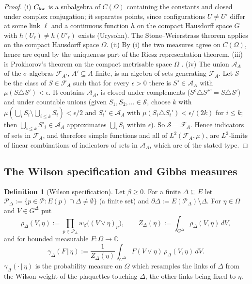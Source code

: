 \documentclass[11pt,a4paper]{article}
\theoremstyle{definition}
\newtheorem{definition}[theorem]{Definition}
\theoremstyle{remark}
\newcommand{\C}{\mathbb{C}}
\newcommand{\cA}{\mathcal{A}}
\newcommand{\cF}{\mathcal{F}}
\newcommand{\cP}{\mathcal{P}}
\begin{document}
\begin{proof}
(i) $C_{\rm loc}$ is a subalgebra of $C(\Omega)$ containing the constants and closed under complex conjugation; it
separates points, since configurations $U\neq U'$ differ at some link $\ell$ and a continuous function $h$ on the compact
Hausdorff space $G$ with $h(U_\ell)\ne h(U'_\ell)$ exists (Urysohn). The Stone--Weierstrass theorem applies on the compact
Hausdorff space $\Omega$. (ii) By (i) the two measures agree on $C(\Omega)$, hence are equal by the uniqueness part of the
Riesz representation theorem. (iii) is Prokhorov's theorem on the compact metrisable space $\Omega$ \cite[Section~5]{Bil99}.
(iv) The union $\cA_A$ of the $\sigma$-algebras $\cF_{A'}$, $A'\subseteq A$ finite, is an algebra of sets generating
$\cF_A$. Let $\mathcal S$ be the class of $S\in\cF_A$ such that for every $\epsilon>0$ there is $S'\in\cA_A$ with
$\mu(S\triangle S')<\epsilon$. It contains $\cA_A$, is closed under complements ($S^c\triangle S'^c=S\triangle S'$) and under
countable unions (given $S_1,S_2,\ldots\in\mathcal S$, choose $k$ with $\mu(\bigcup_iS_i\setminus\bigcup_{i\le k}S_i)<\epsilon/2$
and $S_i'\in\cA_A$ with $\mu(S_i\triangle S_i')<\epsilon/(2k)$ for $i\le k$; then $\bigcup_{i\le k}S'_i\in\cA_A$ approximates
$\bigcup_iS_i$ within $\epsilon$). So $\mathcal S=\cF_A$. Hence indicators of sets in $\cF_A$, and therefore simple functions
and all of $L^2(\cF_A,\mu)$, are $L^2$-limits of linear combinations of indicators of sets in $\cA_A$, which are of the
stated type.
\end{proof}

\subsection{The Wilson specification and Gibbs measures}

\begin{definition}[Wilson specification]\label{iv:def:spec}
Let $\beta\ge0$. For a finite $\Delta\subseteq E$ let $\cP_\Delta:=\{p\in\cP:E(p)\cap\Delta\neq\emptyset\}$ (a finite set)
and $\partial\Delta:=E(\cP_\Delta)\setminus\Delta$. For $\eta\in\Omega$ and $V\in G^\Delta$ put
\[
\rho_\Delta(V,\eta):=\prod_{p\in\cP_\Delta}w_\beta\bigl((V\vee\eta)_p\bigr),\qquad
Z_\Delta(\eta):=\int_{G^\Delta}\rho_\Delta(V,\eta)\,dV,
\]
and for bounded measurable $F:\Omega\to\C$
\[
\gamma_\Delta(F\,|\,\eta):=\frac1{Z_\Delta(\eta)}\int_{G^\Delta}F(V\vee\eta)\,\rho_\Delta(V,\eta)\,dV .
\]
$\gamma_\Delta(\cdot\,|\,\eta)$ is the probability measure on $\Omega$ which resamples the links of $\Delta$ from the Wilson
weight of the plaquettes touching $\Delta$, the other links being fixed to $\eta$.
\end{definition}
\end{document}
